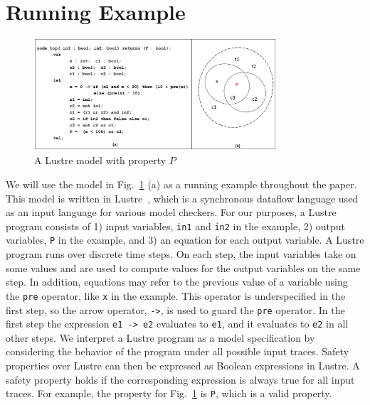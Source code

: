 \section{Running Example}
\label{sec:example}

\begin{figure}
\begin{center}
\includegraphics[width=0.8\textwidth]{figs/ex.png}
\vspace{-0.1in}
\caption{A Lustre model with property $P$}
\label{fig:ex}
\end{center}
\end{figure}


We will use the model in Fig.~\ref{fig:ex} (a) as
a running example throughout the paper. This model is written in Lustre~\cite{Halbwachs91:lustre}, which is a synchronous dataflow language used as an input language for various model checkers. For our purposes, a Lustre program
consists of 1) input variables, {\tt in1} and {\tt in2} in the example, 2) output
variables, {\tt P} in the example, and 3) an
equation for each output variable. A Lustre program runs over discrete
time steps. On each step, the input variables take on some values and
are used to compute values for the output variables on the same step.
In addition, equations may refer to the previous value of a variable
using the {\tt pre} operator, like {\tt x} in the example. This operator is underspecified in the
first step, so the arrow operator, {\tt ->}, is used to guard the
{\tt pre} operator. In the first step the expression {\tt e1 -> e2}
evaluates to {\tt e1}, and it evaluates to {\tt e2} in all other steps. We interpret a Lustre program as a model specification by considering
the behavior of the program under all possible input traces. Safety
properties over Lustre can then be expressed as Boolean expressions in
Lustre. A safety property holds if the corresponding expression is
always true for all input traces. For example, the property for
Fig.~\ref{fig:ex} is {\tt P}, which is a valid property.

